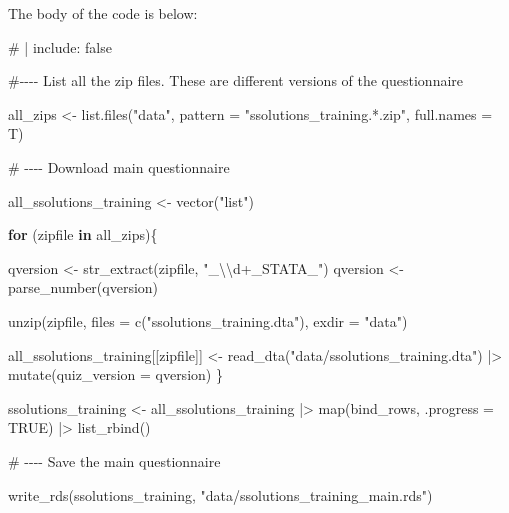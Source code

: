 \documentclass[
  letterpaper,
  DIV=11,
  numbers=noendperiod]{scrreprt}
\newenvironment{Shaded}{\begin{snugshade}}{\end{snugshade}}
\newcommand{\AttributeTok}[1]{\textcolor[rgb]{0.40,0.45,0.13}{#1}}
\newcommand{\CommentTok}[1]{\textcolor[rgb]{0.37,0.37,0.37}{#1}}
\newcommand{\ConstantTok}[1]{\textcolor[rgb]{0.56,0.35,0.01}{#1}}
\newcommand{\ControlFlowTok}[1]{\textcolor[rgb]{0.00,0.23,0.31}{\textbf{#1}}}
\newcommand{\FunctionTok}[1]{\textcolor[rgb]{0.28,0.35,0.67}{#1}}
\newcommand{\NormalTok}[1]{\textcolor[rgb]{0.00,0.23,0.31}{#1}}
\newcommand{\OtherTok}[1]{\textcolor[rgb]{0.00,0.23,0.31}{#1}}
\newcommand{\SpecialCharTok}[1]{\textcolor[rgb]{0.37,0.37,0.37}{#1}}
\newcommand{\StringTok}[1]{\textcolor[rgb]{0.13,0.47,0.30}{#1}}
\begin{document}
The body of the code is below:

\begin{Shaded}
\begin{Highlighting}[]
\CommentTok{\# | include: false}

\CommentTok{\#{-}{-}{-}{-} List all the zip files. These are different versions of the questionnaire}

\NormalTok{all\_zips }\OtherTok{\textless{}{-}} \FunctionTok{list.files}\NormalTok{(}\StringTok{"data"}\NormalTok{, }\AttributeTok{pattern =} \StringTok{"ssolutions\_training.*.zip"}\NormalTok{,}
                       \AttributeTok{full.names =}\NormalTok{ T)}


\CommentTok{\# {-}{-}{-}{-} Download main questionnaire}

\NormalTok{all\_ssolutions\_training }\OtherTok{\textless{}{-}} \FunctionTok{vector}\NormalTok{(}\StringTok{"list"}\NormalTok{)}

\ControlFlowTok{for}\NormalTok{ (zipfile }\ControlFlowTok{in}\NormalTok{ all\_zips)\{}

\NormalTok{  qversion }\OtherTok{\textless{}{-}} \FunctionTok{str\_extract}\NormalTok{(zipfile, }\StringTok{"\_}\SpecialCharTok{\textbackslash{}\textbackslash{}}\StringTok{d+\_STATA\_"}\NormalTok{)}
\NormalTok{  qversion }\OtherTok{\textless{}{-}} \FunctionTok{parse\_number}\NormalTok{(qversion)}


  \FunctionTok{unzip}\NormalTok{(zipfile, }\AttributeTok{files =} \FunctionTok{c}\NormalTok{(}\StringTok{"ssolutions\_training.dta"}\NormalTok{),}
        \AttributeTok{exdir =} \StringTok{"data"}\NormalTok{)}


\NormalTok{  all\_ssolutions\_training[[zipfile]] }\OtherTok{\textless{}{-}} \FunctionTok{read\_dta}\NormalTok{(}\StringTok{"data/ssolutions\_training.dta"}\NormalTok{) }\SpecialCharTok{|\textgreater{}}
    \FunctionTok{mutate}\NormalTok{(}\AttributeTok{quiz\_version =}\NormalTok{ qversion)}
\NormalTok{\}}



\NormalTok{ssolutions\_training }\OtherTok{\textless{}{-}}\NormalTok{ all\_ssolutions\_training }\SpecialCharTok{|\textgreater{}} 
  \FunctionTok{map}\NormalTok{(bind\_rows, }\AttributeTok{.progress =} \ConstantTok{TRUE}\NormalTok{) }\SpecialCharTok{|\textgreater{}}  
  \FunctionTok{list\_rbind}\NormalTok{() }


\CommentTok{\# {-}{-}{-}{-} Save the main questionnaire}

\FunctionTok{write\_rds}\NormalTok{(ssolutions\_training, }\StringTok{"data/ssolutions\_training\_main.rds"}\NormalTok{)}



\end{Highlighting}
\end{Shaded}
\end{document}
